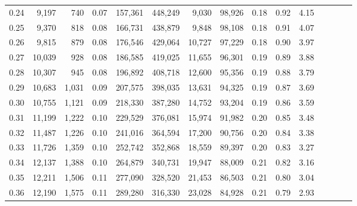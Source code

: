\begin{tabular}{rrrcrrrrrrrrrrr}
0.24 &   9,197 &    740 &                                       0.07 &  157,361 &  448,249 &    9,030 &   98,926 &  0.18 &  0.92 &                         4.15 \\
0.25 &   9,370 &    818 &                                       0.08 &  166,731 &  438,879 &    9,848 &   98,108 &  0.18 &  0.91 &                         4.07 \\
0.26 &   9,815 &    879 &                                       0.08 &  176,546 &  429,064 &   10,727 &   97,229 &  0.18 &  0.90 &                         3.97 \\
0.27 &  10,039 &    928 &                                       0.08 &  186,585 &  419,025 &   11,655 &   96,301 &  0.19 &  0.89 &                         3.88 \\
0.28 &  10,307 &    945 &                                       0.08 &  196,892 &  408,718 &   12,600 &   95,356 &  0.19 &  0.88 &                         3.79 \\
0.29 &  10,683 &  1,031 &                                       0.09 &  207,575 &  398,035 &   13,631 &   94,325 &  0.19 &  0.87 &                         3.69 \\
0.30 &  10,755 &  1,121 &                                       0.09 &  218,330 &  387,280 &   14,752 &   93,204 &  0.19 &  0.86 &                         3.59 \\
0.31 &  11,199 &  1,222 &                                       0.10 &  229,529 &  376,081 &   15,974 &   91,982 &  0.20 &  0.85 &                         3.48 \\
0.32 &  11,487 &  1,226 &                                       0.10 &  241,016 &  364,594 &   17,200 &   90,756 &  0.20 &  0.84 &                         3.38 \\
0.33 &  11,726 &  1,359 &                                       0.10 &  252,742 &  352,868 &   18,559 &   89,397 &  0.20 &  0.83 &                         3.27 \\
0.34 &  12,137 &  1,388 &                                       0.10 &  264,879 &  340,731 &   19,947 &   88,009 &  0.21 &  0.82 &                         3.16 \\
0.35 &  12,211 &  1,506 &                                       0.11 &  277,090 &  328,520 &   21,453 &   86,503 &  0.21 &  0.80 &                         3.04 \\
0.36 &  12,190 &  1,575 &                                       0.11 &  289,280 &  316,330 &   23,028 &   84,928 &  0.21 &  0.79 &                         2.93 \\

\end{tabular}
